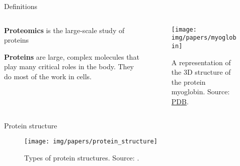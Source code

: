 \documentclass[10pt]{beamer}
\newcommand{\chref}[2]{\href{#1}{{\usebeamercolor[bg]{Feather}#2}}}
\newcommand{\chref}[3][blue]{\href{#2}{\color{#1}{#3}}}%
\newcommand{\1}{
        	\setbeamertemplate{background}{
        		\texttt{[image: img/1]}
        		\tikz[overlay] \fill[fill opacity=0.75,fill=white] (0,0) rectangle (-\paperwidth,\paperheight);
        	}
}
\begin{document}
\begin{frame}{Definitions}{}	
	
	\begin{columns}
		\begin{column}{0.48\textwidth}
			
			\begin{block}{}
				\textbf{Proteomics} is the large-scale study of proteins \cite{anderson1998proteome}
			\end{block}
		
			\begin{block}{}
				\textbf{Proteins} are large, complex molecules that play many critical roles in the body. They do most of the work in cells. \cite{anderson1998proteome}
			\end{block}

		\end{column}
	
		\begin{column}{0.48\textwidth}
		
			\begin{figure}
				\centering
				\texttt{[image: img/papers/myoglobin]}
				\caption{A representation of the 3D structure of the protein myoglobin. Source: \chref{https://pdb101.rcsb.org/motm/1}{PDB}.}
			\end{figure}	
		
		\end{column}
	\end{columns}	
		
\end{frame}

\begin{frame}{Protein structure}{}	
	
	\begin{figure}
		\centering
		\texttt{[image: img/papers/protein\_structure]}
		\caption{Types of protein structures. Source: \cite{russell2002igenetics}.}
	\end{figure}
	
\end{frame}
\end{document}

